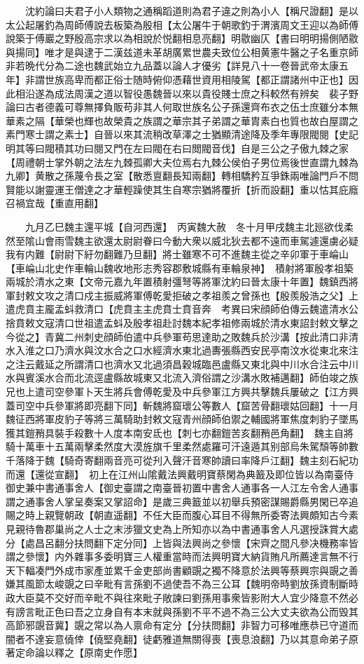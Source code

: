 　　沈約論曰夫君子小人類物之通稱蹈道則為君子違之則為小人【稱尺證翻】是以太公起屠釣為周師傅說去板築為殷相【太公屠牛于朝歌釣于渭濱周文王迎以為師傅說築于傅巖之野殷高宗求以為相說於悦翻相息亮翻】明敭幽仄【書曰明明揚側陋敭與揚同】唯才是與逮于二漢兹道未革胡廣累世農夫致位公相黄憲牛醫之子名重京師非若晩代分為二途也魏武始立九品蓋以論人才優劣【詳見八十一卷晉武帝太康五年】非謂世族高卑而都正俗士随時俯仰憑藉世資用相陵駕【都正謂諸州中正也】因此相沿遂為成法周漢之道以智役愚魏晉以來以貴役賤士庶之科較然有辨矣　裴子野論曰古者德義可尊無擇負販苟非其人何取世族名公子孫還齊布衣之伍士庶雖分本無華素之隔【華榮也輝也故榮貴之族謂之華宗其子弟謂之華胄素白也質也故白屋謂之素門寒士謂之素士】自晉以來其流稍改草澤之士猶顯清途降及季年專限閥閱【史記明其等曰閥積其功曰閱又門在左曰閥在右曰閲閥音伐】自是三公之子傲九棘之家【周禮朝士掌外朝之法左九棘孤卿大夫位焉右九棘公侯伯子男位焉後世直謂九棘為九卿】黄散之孫蔑令長之室【散悉亶翻長知兩翻】轉相驕矜互爭銖兩唯論門戶不問賢能以謝靈運王僧達之才華輕躁使其生自寒宗猶將覆折【折而設翻】重以怙其庇廕召禍宜哉【重直用翻】

　　九月乙巳魏主還平城【自河西還】　丙寅魏大赦　冬十月甲戌魏主北廵欲伐柔然至隂山會雨雪魏主欲還太尉尉眷曰今動大衆以威北狄去都不遠而車駕遽還虜必疑我有内難【尉尉下紆勿翻難乃旦翻】將士雖寒不可不進魏主從之辛卯軍于車崘山【車崘山北史作車輪山魏收地形志秀容郡敷城縣有車輪泉神】　積射將軍殷孝祖築兩城於清水之東【文帝元嘉九年置積射彊弩等將軍沈約曰晉太康十年置】魏鎮西將軍封敕文攻之清口戍主振威將軍傅乾愛拒破之孝祖羨之曾孫也【殷羨殷浩之父】上遣虎賁主龎孟蚪救清口【虎賁主主虎賁士賁音奔　考異曰宋顔師伯傳云魏遣清水公捨賁敕文寇清口世祖遣孟蚪及殷孝祖赴討魏本紀孝祖修兩城於清水東詔封敕文擊之今從之】青冀二州刺史顔師伯遣中兵參軍苟思達助之敗魏兵於沙溝【按此清口非清水入淮之口乃濟水與汶水合之口水經濟水東北過夀張縣西安民亭南汶水從東北來注之注云戴延之所謂清口也濟水又北過須昌穀城臨邑盧縣又東北與中川水合注云中川水與賓溪水合而北流逕盧縣故城東又北流入濟俗謂之沙溝水敗補邁翻】師伯竣之族兄也上遣司空參軍卜天生將兵會傅乾愛及中兵參軍江方興共擊魏兵屢破之【江方興蓋司空中兵參軍將即亮翻下同】斬魏將窟瓌公等數人【窟苦骨翻瓌姑回翻】十一月魏征西將軍皮豹子等將三萬騎助封敕文寇青州顔師伯禦之輔國將軍焦度刺豹子墜馬獲其鎧矟具裝手殺數十人度本南安氐也【刺七亦翻鎧苦亥翻矟邑角翻】　魏主自將騎十萬車十五萬兩擊柔然度大漠旌旗千里柔然處羅可汗遠遁其别部烏朱駕頹等帥數千落降于魏【騎奇寄翻兩音亮可從刋入聲汗音寒帥讀曰率降戶江翻】魏主刻石紀功而還【還從宣翻】　初上在江州山隂戴法興戴明寶蔡閑為典籖及即位皆以為南臺侍御史兼中書通事舍人【御史臺謂之南臺晉初置中書舍人通事各一人江左令舍人通事謂之通事舍人掌呈奏案又掌詔命】是歲三典籖並以初舉兵預密謀賜爵縣男閑已卒追賜之時上親覽朝政【朝直遥翻】不任大臣而腹心耳目不得無所委寄法興頗知古今素見親待魯郡巢尚之人士之末涉獵文史為上所知亦以為中書通事舍人凡選授誅賞大處分【處昌呂翻分扶問翻下定分同】上皆與法興尚之參懷【宋齊之間凡參决機務率皆謂之參懷】内外雜事多委明寶三人權重當時而法興明寶大納貨賄凡所薦達言無不行天下輻凑門外成市家產並累千金吏部尚書顧覬之獨不降意於法興等蔡興宗與覬之善嫌其風節太峻覬之曰辛毗有言孫劉不過使吾不為三公耳【魏明帝時劉放孫資制斷時政大臣莫不交好而辛毗不與往來毗子敞諫曰劉孫用事衆皆影附大人宜少降意不然必有謗言毗正色曰吾之立身自有本末就與孫劉不平不過不為三公大丈夫欲為公而毁其高節邪覬音冀】覬之常以為人禀命有定分【分扶問翻】非智力可移唯應恭已守道而闇者不達妄意僥倖【僥堅堯翻】徒虧雅道無關得喪【喪息浪翻】乃以其意命弟子原著定命論以釋之【原南史作愿】

